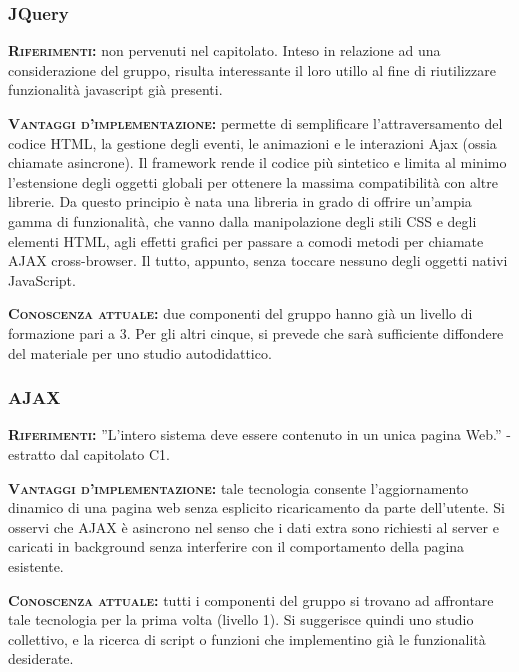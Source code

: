 \subsubsection{JQuery}
\begin{description}
	\item{\scshape\bfseries Riferimenti:} non pervenuti nel capitolato. Inteso in relazione ad una considerazione del gruppo, risulta interessante il loro utillo al fine di riutilizzare funzionalità javascript già presenti.
	
	\item{\scshape\bfseries Vantaggi d'implementazione:} permette di semplificare l'attraversamento del codice HTML, la gestione degli eventi, le animazioni e le interazioni Ajax (ossia chiamate asincrone). Il framework rende il codice più sintetico e limita al minimo l’estensione degli oggetti globali per ottenere la massima compatibilità con altre librerie. Da questo principio è nata una libreria in grado di offrire un'ampia gamma di funzionalità, che vanno dalla manipolazione degli stili CSS e degli elementi HTML, agli effetti grafici per passare a comodi metodi per chiamate AJAX cross-browser. Il tutto, appunto, senza toccare nessuno degli oggetti nativi JavaScript.
	
	\item{\scshape\bfseries Conoscenza attuale:} due componenti del gruppo hanno già un livello di formazione pari a 3. Per gli altri cinque, si prevede che sarà sufficiente diffondere del materiale per uno studio autodidattico.
\end{description}

\subsubsection{AJAX}
\begin{description}
	\item{\scshape\bfseries Riferimenti:} ''L'intero sistema deve essere contenuto in un unica pagina Web.'' - estratto dal capitolato C1.

	\item{\scshape\bfseries Vantaggi d'implementazione:} tale tecnologia consente l'aggiornamento dinamico di una pagina web senza esplicito ricaricamento da parte dell'utente. Si osservi che AJAX è asincrono nel senso che i dati extra sono richiesti al server e caricati in background senza interferire con il comportamento della pagina esistente.
	
	\item{\scshape\bfseries Conoscenza attuale:} tutti i componenti del gruppo si trovano ad affrontare tale tecnologia per la prima volta (livello 1). Si suggerisce quindi uno studio collettivo, e la ricerca di script o funzioni che implementino già le funzionalità desiderate.
\end{description}

